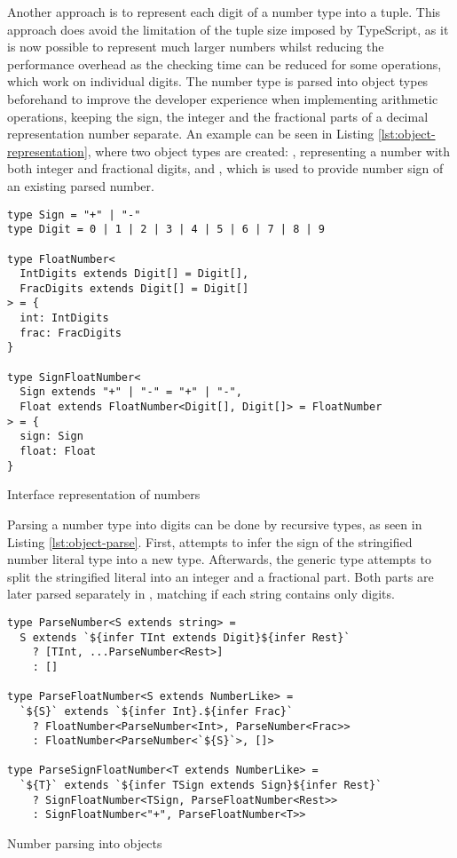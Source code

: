 Another approach is to represent each digit of a number type into a tuple. This approach does avoid the limitation of the tuple size imposed by TypeScript, as it is now possible to represent much larger numbers whilst reducing the performance overhead as the checking time can be reduced for some operations, which work on individual digits. The number type is parsed into object types beforehand to improve the developer experience when implementing arithmetic operations, keeping the sign, the integer and the fractional parts of a decimal representation number separate. An example can be seen in Listing \ref{lst:object-representation}, where two object types are created: , representing a number with both integer and fractional digits, and , which is used to provide number sign of an existing parsed number.

\begin{listing}[ht]
  \begin{verbatim}
type Sign = "+" | "-"
type Digit = 0 | 1 | 2 | 3 | 4 | 5 | 6 | 7 | 8 | 9

type FloatNumber<
  IntDigits extends Digit[] = Digit[],
  FracDigits extends Digit[] = Digit[]
> = {
  int: IntDigits
  frac: FracDigits
}

type SignFloatNumber<
  Sign extends "+" | "-" = "+" | "-",
  Float extends FloatNumber<Digit[], Digit[]> = FloatNumber
> = {
  sign: Sign
  float: Float
}
\end{verbatim}
  \caption{Interface representation of numbers}\label{lst:object-representation}
\end{listing}

Parsing a number type into digits can be done by recursive types, as seen in Listing \ref{lst:object-parse}. First,  attempts to infer the sign of the stringified number literal type into a new  type. Afterwards, the  generic type attempts to split the stringified literal into an integer and a fractional part. Both parts are later parsed separately in , matching if each string contains only digits.

\begin{listing}[ht]
  \begin{verbatim}
type ParseNumber<S extends string> =
  S extends `${infer TInt extends Digit}${infer Rest}`
    ? [TInt, ...ParseNumber<Rest>]
    : []

type ParseFloatNumber<S extends NumberLike> =
  `${S}` extends `${infer Int}.${infer Frac}`
    ? FloatNumber<ParseNumber<Int>, ParseNumber<Frac>>
    : FloatNumber<ParseNumber<`${S}`>, []>

type ParseSignFloatNumber<T extends NumberLike> =
  `${T}` extends `${infer TSign extends Sign}${infer Rest}`
    ? SignFloatNumber<TSign, ParseFloatNumber<Rest>>
    : SignFloatNumber<"+", ParseFloatNumber<T>>
\end{verbatim}
  \caption{Number parsing into objects}\label{lst:object-parse}
\end{listing}

